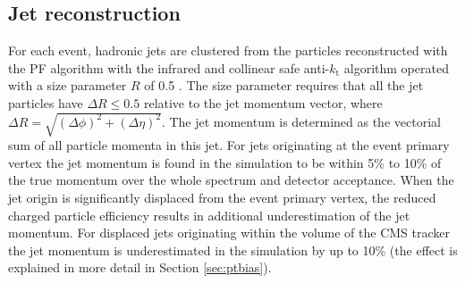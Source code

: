 \subsection{Jet reconstruction}

For each event, hadronic jets are clustered from the particles reconstructed with the PF algorithm
 with the infrared and collinear safe
 anti-$k_\mathrm{t}$ algorithm 
operated with a size parameter $R$ of 0.5 \cite{Cacciari:2008gp}. The size parameter requires that all the jet 
particles have $\Delta R \leq 0.5$ relative to the jet momentum vector, where
 $\Delta R=\sqrt{(\Delta\phi)^2 + (\Delta\eta)^2}$. 
The jet momentum is determined as the vectorial sum of all particle momenta in this jet.
For jets originating at the event primary vertex the jet momentum is found in the simulation to be within 5\% to 10\% of the true momentum over 
the whole \pt spectrum and detector acceptance. 
When the jet origin is significantly displaced from the event primary vertex, the reduced 
charged particle efficiency results in additional underestimation of the jet momentum. 
For displaced jets originating within the volume of the CMS tracker the jet momentum is underestimated in the simulation by up to 10\% (the effect is explained in more detail in Section \ref{sec:ptbias}).


